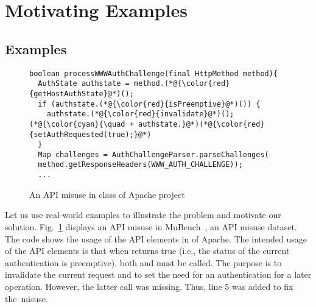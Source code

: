 \section{Motivating Examples}
\label{sec:motiv}

\subsection{Examples}

\begin{figure}[t]
	\centering
\begin{lstlisting}[]
boolean processWWWAuthChallenge(final HttpMethod method){
  AuthState authstate = method.(*@{\color{red}{getHostAuthState}@*)();
  if (authstate.(*@{\color{red}{isPreemptive}@*)()) {
    authstate.(*@{\color{red}{invalidate}@*)();
(*@{\color{cyan}{\quad + authstate.}@*)(*@{\color{red}{setAuthRequested(true);}@*)
  }
  Map challenges = AuthChallengeParser.parseChallenges(
  method.getResponseHeaders(WWW_AUTH_CHALLENGE));
  ...
\end{lstlisting}
        \vspace{-12pt}
        \caption{An API misuse in class  of
          Apache  project}
        \vspace{-6pt}
        \label{fig:example1}
\end{figure}


Let us use real-world examples to illustrate the problem and motivate
our solution. Fig.~\ref{fig:example1} displays an API misuse in
MuBench~\cite{mudetect-msr19}, an API misuse dataset. The code shows
the usage of the API elements in  of Apache.  The
intended usage of the API elements is that when
 returns true (i.e., the
status of the current authentication is preemptive), both
 and
 must be called. The
purpose is to invalidate the current request and to set the need for
an authentication for a later operation. However, the latter call was
missing. Thus, line 5 was added to fix the~misuse.

